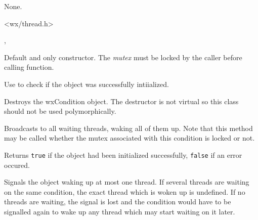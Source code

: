 
None.


<wx/thread.h>


, 


\label{wxconditionctor}


Default and only constructor. The {\it mutex} must be locked by the caller
before calling  function.

Use  to check if the object was successfully
intiialized.

\label{wxconditiondtor}


Destroys the wxCondition object. The destructor is not virtual so this class
should not be used polymorphically.

\label{wxconditionbroadcast}


Broadcasts to all waiting threads, waking all of them up. Note that this method
may be called whether the mutex associated with this condition is locked or
not.



\label{wxconditionisok}


Returns {\tt true} if the object had been initialized successfully, {\tt false} 
if an error occured.

\label{wxconditionsignal}


Signals the object waking up at most one thread. If several threads are waiting
on the same condition, the exact thread which is woken up is undefined. If no
threads are waiting, the signal is lost and the condition would have to be
signalled again to wake up any thread which may start waiting on it later.

